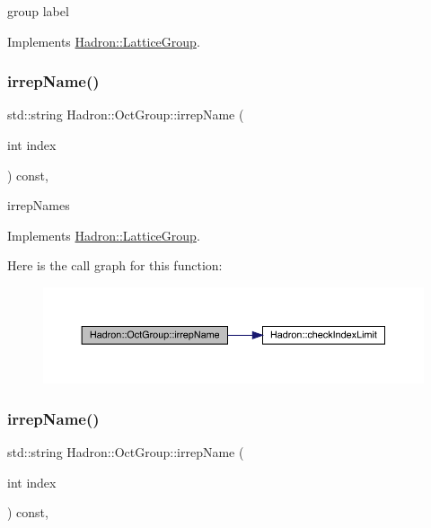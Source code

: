 group label 

Implements \mbox{\hyperlink{structHadron_1_1LatticeGroup_a82208a322bf1b1db489f16af38e70087}{Hadron\+::\+Lattice\+Group}}.

\mbox{\label{structHadron_1_1OctGroup_a58f84ff32d1dce2277f3b9da9d35d594}} 
\subsubsection{\texorpdfstring{irrepName()}{irrepName()}\hspace{0.1cm}{\footnotesize\ttfamily [1/2]}}
{\footnotesize\ttfamily std\+::string Hadron\+::\+Oct\+Group\+::irrep\+Name (\begin{DoxyParamCaption}\item[{int}]{index }\end{DoxyParamCaption}) const\hspace{0.3cm}{\ttfamily [inline]}, {\ttfamily [virtual]}}

irrep\+Names 

Implements \mbox{\hyperlink{structHadron_1_1LatticeGroup_a4bc5620218c2a73157e19bc4451fe746}{Hadron\+::\+Lattice\+Group}}.

Here is the call graph for this function\+:
\nopagebreak
\begin{figure}[H]
\begin{center}
\leavevmode
\includegraphics[width=350pt]{d1/de5/structHadron_1_1OctGroup_a58f84ff32d1dce2277f3b9da9d35d594_cgraph}
\end{center}
\end{figure}
\mbox{\label{structHadron_1_1OctGroup_a58f84ff32d1dce2277f3b9da9d35d594}} 
\subsubsection{\texorpdfstring{irrepName()}{irrepName()}\hspace{0.1cm}{\footnotesize\ttfamily [2/2]}}
{\footnotesize\ttfamily std\+::string Hadron\+::\+Oct\+Group\+::irrep\+Name (\begin{DoxyParamCaption}\item[{int}]{index }\end{DoxyParamCaption}) const\hspace{0.3cm}{\ttfamily [inline]}, {\ttfamily [virtual]}}

